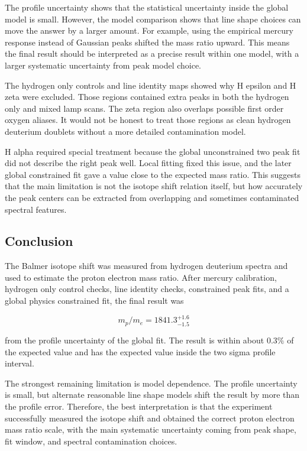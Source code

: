 \documentclass[11pt]{article}
\begin{document}
The profile uncertainty shows that the statistical uncertainty inside the global model is small. However, the model comparison shows that line shape choices can move the answer by a larger amount. For example, using the empirical mercury response instead of Gaussian peaks shifted the mass ratio upward. This means the final result should be interpreted as a precise result within one model, with a larger systematic uncertainty from peak model choice.

The hydrogen only controls and line identity maps showed why H epsilon and H zeta were excluded. Those regions contained extra peaks in both the hydrogen only and mixed lamp scans. The zeta region also overlaps possible first order oxygen aliases. It would not be honest to treat those regions as clean hydrogen deuterium doublets without a more detailed contamination model.

H alpha required special treatment because the global unconstrained two peak fit did not describe the right peak well. Local fitting fixed this issue, and the later global constrained fit gave a value close to the expected mass ratio. This suggests that the main limitation is not the isotope shift relation itself, but how accurately the peak centers can be extracted from overlapping and sometimes contaminated spectral features.

\subsection{Conclusion}

The Balmer isotope shift was measured from hydrogen deuterium spectra and used to estimate the proton electron mass ratio. After mercury calibration, hydrogen only control checks, line identity checks, constrained peak fits, and a global physics constrained fit, the final result was

\[
\boxed{
m_p/m_e = 1841.3^{+1.6}_{-1.5}
}
\]

from the profile uncertainty of the global fit. The result is within about \(0.3\%\) of the expected value and has the expected value inside the two sigma profile interval.

The strongest remaining limitation is model dependence. The profile uncertainty is small, but alternate reasonable line shape models shift the result by more than the profile error. Therefore, the best interpretation is that the experiment successfully measured the isotope shift and obtained the correct proton electron mass ratio scale, with the main systematic uncertainty coming from peak shape, fit window, and spectral contamination choices.
\end{document}
